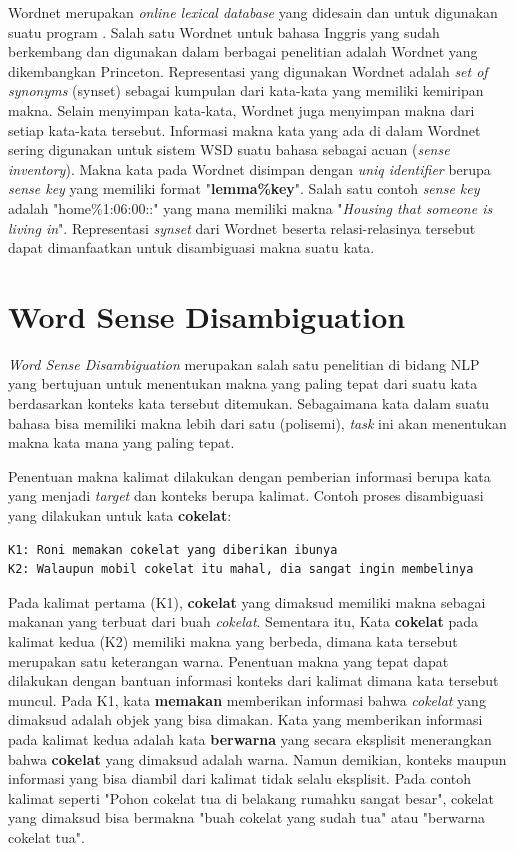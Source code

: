 Wordnet merupakan \textit{online lexical database} yang didesain dan untuk digunakan suatu program \citep{miller1995wordnet}. Salah satu Wordnet untuk bahasa Inggris yang sudah berkembang dan digunakan dalam berbagai penelitian adalah Wordnet yang dikembangkan Princeton. Representasi yang digunakan Wordnet adalah \textit{set of synonyms} (synset) sebagai kumpulan dari kata-kata yang memiliki kemiripan makna. Selain menyimpan kata-kata, Wordnet juga menyimpan makna dari setiap kata-kata tersebut. Informasi makna kata yang ada di dalam Wordnet sering digunakan untuk sistem WSD suatu bahasa sebagai acuan (\textit{sense inventory}). Makna kata pada Wordnet disimpan dengan \textit{uniq identifier} berupa \textit{sense key} yang memiliki format "\textbf{lemma\%key}". Salah satu contoh \textit{sense key} adalah "home\%1:06:00::" yang mana memiliki makna "\textit{Housing that someone is living in}". Representasi \textit{synset} dari Wordnet beserta relasi-relasinya tersebut dapat dimanfaatkan untuk disambiguasi makna suatu kata.

\section{Word Sense Disambiguation}
\textit{Word Sense Disambiguation} merupakan salah satu penelitian di bidang NLP yang bertujuan untuk menentukan makna yang paling tepat dari suatu kata berdasarkan konteks kata tersebut ditemukan. Sebagaimana kata dalam suatu bahasa bisa memiliki makna lebih dari satu (polisemi), \textit{task} ini akan menentukan makna kata mana yang paling tepat. 

Penentuan makna kalimat dilakukan dengan pemberian informasi berupa kata yang menjadi \textit{target} dan konteks berupa kalimat. Contoh proses disambiguasi yang dilakukan untuk kata \textbf{cokelat}:

\begin{lstlisting}[backgroundcolor = \color{white}]
K1: Roni memakan cokelat yang diberikan ibunya
K2: Walaupun mobil cokelat itu mahal, dia sangat ingin membelinya
\end{lstlisting}


Pada kalimat pertama (K1), \textbf{cokelat} yang dimaksud memiliki makna sebagai makanan yang terbuat dari buah \textit{cokelat}. Sementara itu, Kata \textbf{cokelat} pada kalimat kedua (K2) memiliki makna yang berbeda, dimana kata tersebut merupakan satu keterangan warna. Penentuan makna yang tepat dapat dilakukan dengan bantuan informasi konteks dari kalimat dimana kata tersebut muncul. Pada K1, kata \textbf{memakan} memberikan informasi bahwa \textit{cokelat} yang dimaksud adalah objek yang bisa dimakan. Kata yang memberikan informasi pada kalimat kedua adalah kata \textbf{berwarna} yang secara eksplisit menerangkan bahwa \textbf{cokelat} yang dimaksud adalah warna. Namun demikian, konteks maupun informasi yang bisa diambil dari kalimat tidak selalu eksplisit. Pada contoh kalimat seperti "Pohon cokelat tua di belakang rumahku sangat besar", cokelat yang dimaksud bisa bermakna "buah cokelat yang sudah tua" atau "berwarna cokelat tua".

